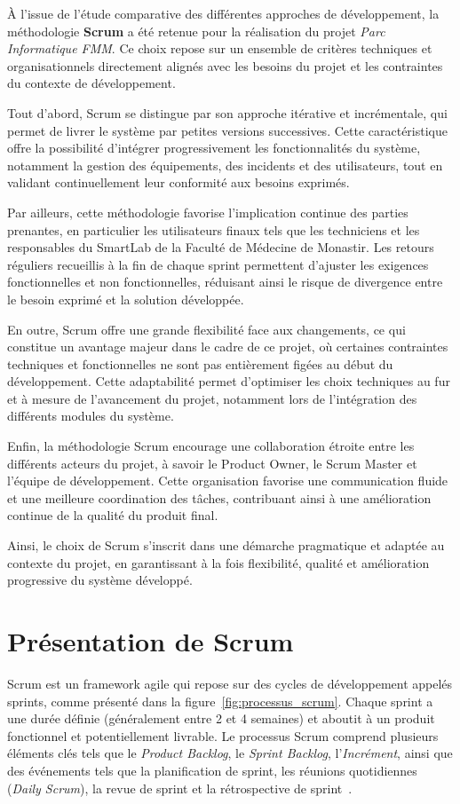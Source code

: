 À l’issue de l’étude comparative des différentes approches de développement, la méthodologie \textbf{Scrum} a été retenue pour la réalisation du projet \textit{Parc Informatique FMM}. Ce choix repose sur un ensemble de critères techniques et organisationnels directement alignés avec les besoins du projet et les contraintes du contexte de développement.

Tout d’abord, Scrum se distingue par son approche itérative et incrémentale, qui permet de livrer le système par petites versions successives. Cette caractéristique offre la possibilité d’intégrer progressivement les fonctionnalités du système, notamment la gestion des équipements, des incidents et des utilisateurs, tout en validant continuellement leur conformité aux besoins exprimés.

Par ailleurs, cette méthodologie favorise l’implication continue des parties prenantes, en particulier les utilisateurs finaux tels que les techniciens et les responsables du SmartLab de la Faculté de Médecine de Monastir. Les retours réguliers recueillis à la fin de chaque sprint permettent d’ajuster les exigences fonctionnelles et non fonctionnelles, réduisant ainsi le risque de divergence entre le besoin exprimé et la solution développée.

En outre, Scrum offre une grande flexibilité face aux changements, ce qui constitue un avantage majeur dans le cadre de ce projet, où certaines contraintes techniques et fonctionnelles ne sont pas entièrement figées au début du développement. Cette adaptabilité permet d’optimiser les choix techniques au fur et à mesure de l’avancement du projet, notamment lors de l’intégration des différents modules du système.

Enfin, la méthodologie Scrum encourage une collaboration étroite entre les différents acteurs du projet, à savoir le Product Owner, le Scrum Master et l’équipe de développement. Cette organisation favorise une communication fluide et une meilleure coordination des tâches, contribuant ainsi à une amélioration continue de la qualité du produit final.

Ainsi, le choix de Scrum s’inscrit dans une démarche pragmatique et adaptée au contexte du projet, en garantissant à la fois flexibilité, qualité et amélioration progressive du système développé.
\section{Présentation de Scrum}
\label{sec:presentation_scrum}
Scrum est un framework agile qui repose sur des cycles de développement appelés sprints, comme présenté dans la figure~\ref{fig:processus_scrum}. Chaque sprint a une durée définie (généralement entre 2 et 4 semaines) et aboutit à un produit fonctionnel et potentiellement livrable. Le processus Scrum comprend plusieurs éléments clés tels que le \textit{Product Backlog}, le \textit{Sprint Backlog}, l'\textit{Incrément}, ainsi que des événements tels que la planification de sprint, les réunions quotidiennes (\textit{Daily Scrum}), la revue de sprint et la rétrospective de sprint~\cite{atlassian2023scrum}.

